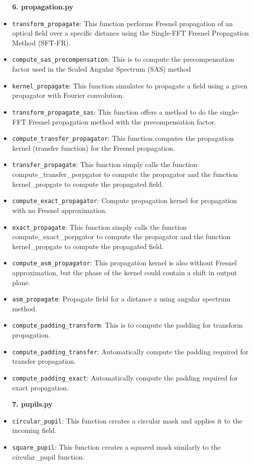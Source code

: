 \documentclass[a4paper,12pt]{report}
\begin{document}
\begin{itemize}
    \vspace{1em}
    {\large \textbf{6. propagation.py}}
    \item \texttt{transform\_propagate}: This function performs Fresnel propagation of an optical field over a specific distance using the Single-FFT Fresnel Propagation Method (SFT-FR).
    \item \texttt{compute\_sas\_precompensation}: This is to compute the precompensation factor used in the Scaled Angular Spectrum (SAS) method
    \item \texttt{kernel\_propagate}: This function simulates to propagate a field using a given propagator with Fourier convolution.
    \item \texttt{transform\_propagate\_sas}: This function offers a method to do the single-FFT Fresnel propagation method with the precompensation factor.
    \item \texttt{compute\_transfer\_propagator}: This function computes the propagation kernel (transfer function) for the Fresnel propagation.
    \item \texttt{transfer\_propagate}: This function simply calls the function compute\_transfer\_porpgator to compute the propagator and the function kernel\_propgate to compute the propagated field.
    \item \texttt{compute\_exact\_propagator}: Compute propagation kernel for propagation with no Fresnel approximation.
    \item \texttt{exact\_propagate}: This function simply calls the function compute\_exact\_porpgator to compute the propagator and the function kernel\_propgate to compute the propagated field.
    \item \texttt{compute\_asm\_propagator}: This propagation kernel is also without Fresnel approximation, but the phase of the kernel could contain a shift in output plane.
    \item \texttt{asm\_propagate}: Propagate field for a distance z using angular spectrum method.
    \item \texttt{compute\_padding\_transform}: This is to compute the padding for transform propagation.
    \item \texttt{compute\_padding\_transfer}: Automatically compute the padding required for transfer propagation.
    \item \texttt{compute\_padding\_exact}: Automatically compute the padding required for exact propagation.
    
    \vspace{1em}
    {\large \textbf{7. pupils.py}}
    \item \texttt{circular\_pupil}: This function creates a circular mask and applies it to the incoming field.
    \item \texttt{square\_pupil}: This function creates a squared mask similarly to the circular\_pupil function.
    

\end{itemize}
\end{document}
